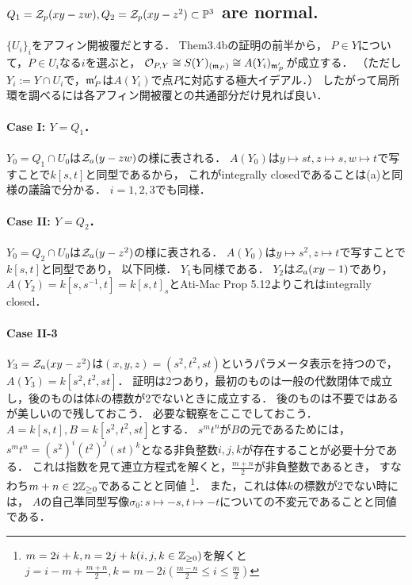 \documentclass[a4paper]{jarticle}
\begin{document}

    \subsection{$Q_1=\mathcal{Z}_p(xy-zw), Q_2=\mathcal{Z}_p(xy-z^2) \subset \mathbb{P}^3$ are normal.}
    $\{U_i\}_i$をアフィン開被覆だとする．
    Them3.4bの証明の前半から，
    $P \in Y$について，$P \in U_i$なる$i$を選ぶと，
    $\mathcal{O}_{P,Y} \cong S(Y)_{(\mathfrak{m}_P)} \cong A(Y_i)_{\mathfrak{m}'_P}$が成立する．
    （ただし$Y_i:=Y \cap U_i$で，$\mathfrak{m}'_P$は$A(Y_i)$で点$P$に対応する極大イデアル．）
    したがって局所環を調べるには各アフィン開被覆との共通部分だけ見れば良い．

    \paragraph{Case I: $Y=Q_1$．}
    $Y_0=Q_1 \cap U_0$は$\mathcal{Z}_a(y-zw)$の様に表される．
    $A(Y_0)$は$y \mapsto st, z \mapsto s, w \mapsto t$で写すことで$k[s,t]$と同型であるから，
    これがintegrally closedであることは(a)と同様の議論で分かる．
    $i=1,2,3$でも同様．

    \paragraph{Case II: $Y=Q_2$．}
    $Y_0=Q_2 \cap U_0$は$\mathcal{Z}_a(y-z^2)$の様に表される．
    $A(Y_0)$は$y \mapsto s^2, z \mapsto t$で写すことで$k[s,t]$と同型であり，
    以下同様．
    $Y_1$も同様である．
    $Y_2$は$\mathcal{Z}_a(xy-1)$であり，
    $A(Y_2)=k[s,s^{-1},t]=k[s,t]_{s}$とAti-Mac Prop 5.12よりこれはintegrally closed．

    \paragraph{Case II-3}
    $Y_3=\mathcal{Z}_a(xy-z^2)$は$(x,y,z)=(s^2,t^2,st)$というパラメータ表示を持つので，$A(Y_3)=k[s^2,t^2,st]$．
    証明は2つあり，最初のものは一般の代数閉体で成立し，後のものは体$k$の標数が2でないときに成立する．
    後のものは不要ではあるが美しいので残しておこう．
    必要な観察をここでしておこう．
    $A=k[s,t], B=k[s^2,t^2,st]$とする．
    $s^m t^n$が$B$の元であるためには，
    $s^m t^n=(s^2)^i (t^2)^j (st)^k$となる非負整数$i,j,k$が存在することが必要十分である．
    これは指数を見て連立方程式を解くと，$\frac{m+n}{2}$が非負整数であるとき，
    すなわち$m+n \in 2\mathbb{Z}_{\geq 0}$であることと同値
    \footnote{$m=2i+k, n=2j+k (i,j,k \in \mathbb{Z}_{\geq 0})$を解くと$j=i-m+\frac{m+n}{2}, k=m-2i (\frac{m-n}{2} \leq i \leq \frac{m}{2})$}．
    また，これは体$k$の標数が2でない時には，
    $A$の自己準同型写像$\sigma_0: s \mapsto -s, t \mapsto -t$についての不変元であることと同値である．
\end{document}
